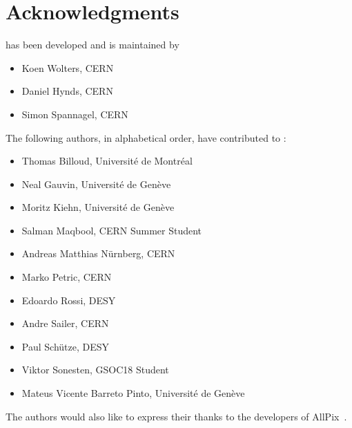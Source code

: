 \chapter{Acknowledgments}

\apsq has been developed and is maintained by

\begin{itemize}
\item Koen Wolters, CERN
\item Daniel Hynds, CERN
\item Simon Spannagel, CERN
\end{itemize}

The following authors, in alphabetical order, have contributed to \apsq:

\begin{itemize}
\item  Thomas Billoud, Université de Montréal
\item Neal Gauvin, Université de Genève
\item  Moritz Kiehn, Université de Genève
\item  Salman Maqbool, CERN Summer Student
\item  Andreas Matthias Nürnberg, CERN
\item  Marko Petric, CERN
\item  Edoardo Rossi, DESY
\item  Andre Sailer, CERN
\item  Paul Schütze, DESY
\item  Viktor Sonesten, GSOC18 Student
\item  Mateus Vicente Barreto Pinto, Université de Genève
\end{itemize}

The authors would also like to express their thanks to the developers of AllPix~\cite{ap1wiki,ap1git}.
